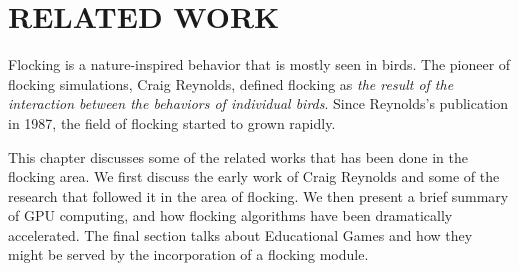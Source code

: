 \chapter{RELATED WORK}\label{chap2}


Flocking is a nature-inspired behavior that is mostly seen in birds. The pioneer of flocking simulations, Craig Reynolds, defined flocking as \textit{the result of the interaction between the behaviors of individual birds}\cite{craig1}. Since Reynolds's publication in 1987, the field of flocking started to grown rapidly. %

This chapter discusses some of the related works that has been done in the flocking area. We first discuss the early work of Craig Reynolds and some of the research that followed it in the area of flocking. We then present a brief summary of GPU computing, and how flocking algorithms have been dramatically accelerated. The final section talks about Educational Games and how they might be served by the incorporation of a flocking module. 





